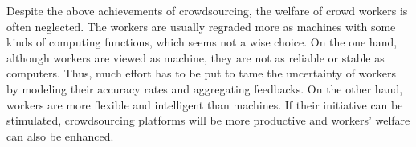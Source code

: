 \documentclass[11pt]{article}
\begin{document}
Despite the above achievements of crowdsourcing, the welfare of crowd workers is often neglected.
The workers are usually regraded more as machines with some kinds of computing functions, which seems not a wise choice.
On the one hand, although workers are viewed as machine, they are not as reliable or stable as computers.
Thus, much effort has to be put to tame the uncertainty of workers by modeling their accuracy rates and aggregating feedbacks.
On the other hand, workers are more flexible and intelligent than machines.
If their initiative can be stimulated, crowdsourcing platforms will be more productive and workers' welfare can also be enhanced.

\end{document}
